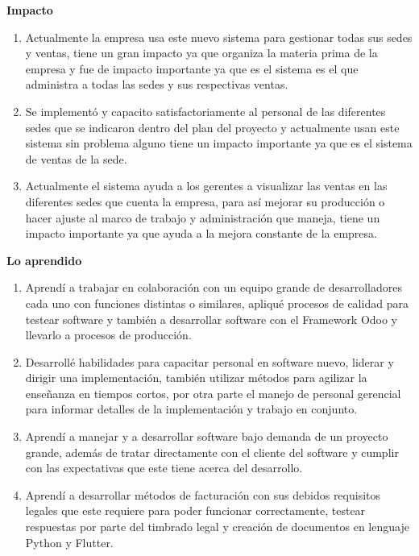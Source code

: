 \documentclass[protocolo.tex]{subfiles}
\begin{document}
\textbf{Impacto}
\begin{enumerate}
\item Actualmente la empresa usa este nuevo sistema para gestionar todas sus sedes y ventas,
tiene un gran impacto ya que organiza la materia prima de la empresa y fue de impacto
importante ya que es el sistema es el que administra a todas las sedes y sus respectivas
ventas.

\item Se implementó y capacito satisfactoriamente al personal de las diferentes sedes que se
indicaron dentro del plan del proyecto y actualmente usan este sistema sin problema alguno
tiene un impacto importante ya que es el sistema de ventas de la sede.

\item Actualmente el sistema ayuda a los gerentes a visualizar las ventas en las diferentes
sedes que cuenta la empresa, para así mejorar su producción o hacer ajuste al marco de
trabajo y administración que maneja, tiene un impacto importante ya que ayuda a la mejora
constante de la empresa.



\end{enumerate}

\textbf{Lo aprendido}
\begin{enumerate}
\item Aprendí a trabajar en colaboración con un equipo grande de desarrolladores cada uno
con funciones distintas o similares, apliqué procesos de calidad para testear software y
también a desarrollar software con el Framework Odoo y llevarlo a procesos de producción.


\item Desarrollé habilidades para capacitar personal en software nuevo, liderar y dirigir una
implementación, también utilizar métodos para agilizar la enseñanza en tiempos cortos, por
otra parte el manejo de personal gerencial para informar detalles de la implementación y
trabajo en conjunto.


\item Aprendí a manejar y a desarrollar software bajo demanda de un proyecto grande,
además de tratar directamente con el cliente del software y cumplir con las expectativas que
este tiene acerca del desarrollo.

\item Aprendí a desarrollar métodos de facturación con sus debidos requisitos legales que este
requiere para poder funcionar correctamente, testear respuestas por parte del timbrado legal
y creación de documentos en lenguaje Python y Flutter.

\end{enumerate}
\end{document}
